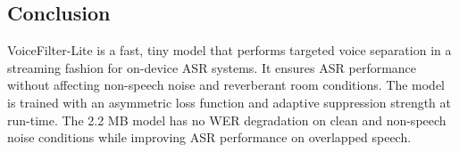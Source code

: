 \subsection{Conclusion}
VoiceFilter-Lite is a fast, tiny model that performs targeted voice separation in a streaming fashion for on-device ASR systems. It ensures ASR performance without affecting non-speech noise and reverberant room conditions. The model is trained with an asymmetric loss function and adaptive suppression strength at run-time. The 2.2 MB model has no WER degradation on clean and non-speech noise conditions while improving ASR performance on overlapped speech.